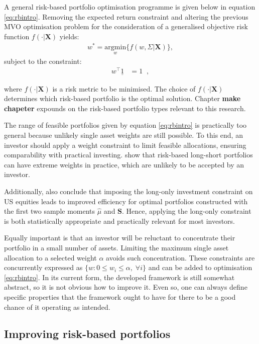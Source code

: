 \documentclass[
]{article}
\begin{document}
A general risk-based portfolio optimisation programme is given below in equation \eqref{eq:rbintro}.
Removing the expected return constraint and altering the previous MVO optimisation problem for the
consideration of a generalised objective risk function \(f(\cdot| \textbf{X})\) yields:
\begin{align}
w^* = \underset{w}{\text{argmin}} \Big \{ f(w, \Sigma| \textbf{X}) \Big \}, \label{eq:rbintro}
\end{align}
subject to the constraint:
\begin{align*}
w^\intercal \underline{1} &= 1 \;\; ,
\end{align*}

where \(f(\cdot | \textbf{X})\) is a risk metric to be minimised. The choice of \(f(\cdot | \textbf{X})\) determines which risk-based portfolio is the optimal solution. Chapter \textbf{make
chapeter} expounds on the risk-based portfolio types relevant to this research.

The range of feasible portfolios given by equation \eqref{eq:rbintro} is practically too general
because unlikely single asset weights are still possible. To this end, an investor should apply a
weight constraint to limit feasible allocations, ensuring comparability with practical investing.
\citet{JM03} show that risk-based long-short portfolios can have extreme weights in practice, which are
unlikely to be accepted by an investor.

Additionally, \citet{JM03} also conclude that imposing the long-only investment constraint on US equities
leads to improved efficiency for optimal portfolios constructed with the first two sample moments
\(\hat{\mu}\) and \(\textbf{S}\). Hence, applying the long-only constraint is both statistically
appropriate and practically relevant for most investors.

Equally important is that an investor will be reluctant to concentrate their portfolio in a small
number of assets. Limiting the maximum single asset allocation to a selected weight \(\alpha\) avoids
such concentration. These constraints are concurrently expressed as
\(\{w :0 \leq w_i \leq \alpha, \; \forall i \}\) and can be added to optimisation \eqref{eq:rbintro}.
In its current form, the developed framework is still somewhat abstract, so it is not obvious how
to improve it. Even so, one can always define specific properties that the framework ought to have
for there to be a good chance of it operating as intended.

\hypertarget{improving-risk-based-portfolios}{%
\subsection{Improving risk-based portfolios}\label{improving-risk-based-portfolios}}
\end{document}
